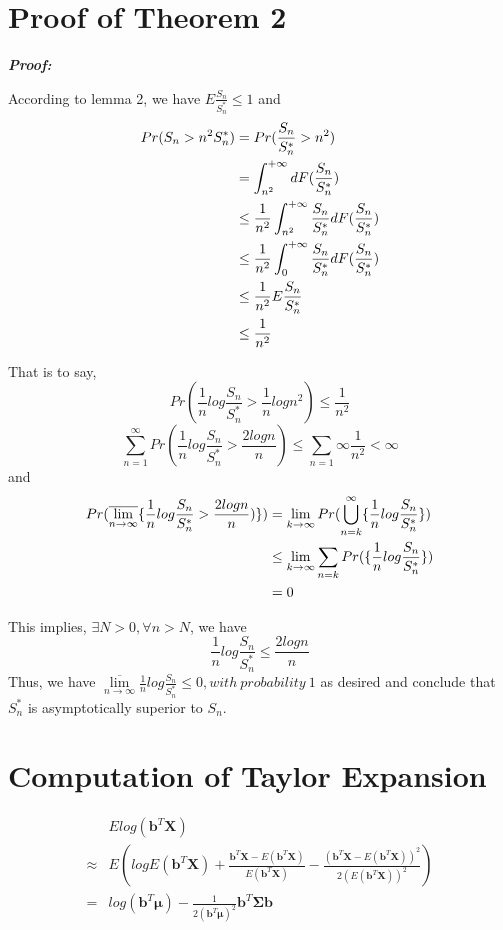 \documentclass{gapd}
\begin{document}
\section{Proof of Theorem 2}

\noindent\it{\textbf{Proof:}}

According to lemma 2, we have $E\frac{S_n}{S_n^*} \le 1$ and
\begin{equation}
\begin{aligned}
Pr(S_n>n^2S_n^*)&=Pr(\frac{S_n}{S_n^*}>n^2)\\
&=\int_{n^2}^{+\infty}dF(\frac{S_n}{S_n^*})\\
& \le \frac{1}{n^2}\int_{n^2}^{+\infty}\frac{S_n}{S_n^*}dF(\frac{S_n}{S_n^*})\\
& \le \frac{1}{n^2}\int_{0}^{+\infty}\frac{S_n}{S_n^*}dF(\frac{S_n}{S_n^*})\\
& \le \frac{1}{n^2} E\frac{S_n}{S_n^*}\\
& \le \frac{1}{n^2}
\end{aligned}\notag
\end{equation}

That is to say,
$$Pr(\frac{1}{n}log\frac{S_n}{S_n^*}>\frac{1}{n}log n^2)\le \frac{1}{n^2}$$
$$\sum_{n=1}^{\infty}Pr(\frac{1}{n}log\frac{S_n}{S_n^*}>\frac{2logn}{n})\le \sum_{n=1}{\infty}\frac{1}{n^2}<\infty$$
and
\begin{equation}
\begin{aligned}
Pr(\overline{\lim\limits_{n \to \infty}}\{\frac{1}{n}log\frac{S_n}{S_n^*}>\frac{2logn}{n})\})&=\lim\limits_{k \to \infty}Pr(\bigcup_{n=k}^{\infty}\{\frac{1}{n}log\frac{S_n}{S_n^*}\})\\
& \le \lim\limits_{k \to \infty} \sum_{n=k}Pr(\{\frac{1}{n}log\frac{S_n}{S_n^*}\})\\
&=0
\end{aligned}\notag
\end{equation}

This implies, $\exists N>0,\forall n>N$, we have
$$\frac{1}{n}log\frac{S_n}{S_n^*} \le \frac{2logn}{n}$$
Thus, we have $\overline{\lim\limits_{n \to \infty}}\frac{1}{n}log\frac{S_n}{S_n^*} \le 0, with\ probability\ 1$ as desired and conclude that $S_n^*$ is asymptotically superior to $S_n$.

\section{Computation of Taylor Expansion}

\begin{equation}
\begin{aligned}
&Elog(\mathbf{b}^T\mathbf{X})\\
\approx& E(logE(\mathbf{b}^T\mathbf{X})+\frac{\mathbf{b}^T\mathbf{X}-E(\mathbf{b}^T\mathbf{X})}{E(\mathbf{b}^T\mathbf{X})}-\frac{(\mathbf{b}^T\mathbf{X}-E(\mathbf{b}^T\mathbf{X}))^2}{2(E(\mathbf{b}^T\mathbf{X}))^2})\\
=&log(\mathbf{b}^T \boldsymbol{\mu})-\frac{1}{2(\mathbf{b}^T\boldsymbol{\mu})^2}\mathbf{b}^T\mathbf{\Sigma}\mathbf{b}
\end{aligned}\tag{4}
\end{equation}
\end{document}
